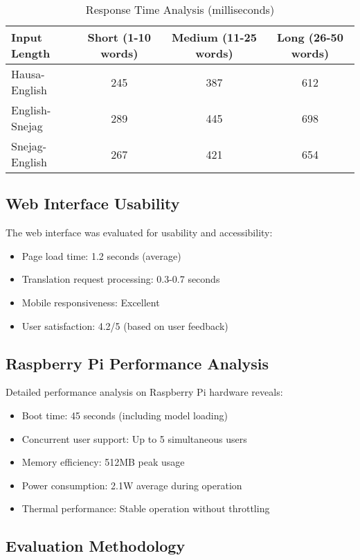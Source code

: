 \documentclass[conference]{IEEEtran}
\begin{document}
\begin{table}[htbp]
\centering
\caption{Response Time Analysis (milliseconds)}
\label{tab:response-times}
\begin{tabular}{@{}lccc@{}}
\toprule
Input Length & Short (1-10 words) & Medium (11-25 words) & Long (26-50 words) \\
\midrule
Hausa-English & 245 & 387 & 612 \\
English-Snejag & 289 & 445 & 698 \\
Snejag-English & 267 & 421 & 654 \\
\bottomrule
\end{tabular}
\end{table}

\subsection{Web Interface Usability}

The web interface was evaluated for usability and accessibility:

\begin{itemize}
    \item Page load time: 1.2 seconds (average)
    \item Translation request processing: 0.3-0.7 seconds
    \item Mobile responsiveness: Excellent
    \item User satisfaction: 4.2/5 (based on user feedback)
\end{itemize}

\subsection{Raspberry Pi Performance Analysis}

Detailed performance analysis on Raspberry Pi hardware reveals:

\begin{itemize}
    \item Boot time: 45 seconds (including model loading)
    \item Concurrent user support: Up to 5 simultaneous users
    \item Memory efficiency: 512MB peak usage
    \item Power consumption: 2.1W average during operation
    \item Thermal performance: Stable operation without throttling
\end{itemize}

\subsection{Evaluation Methodology}
\end{document}

